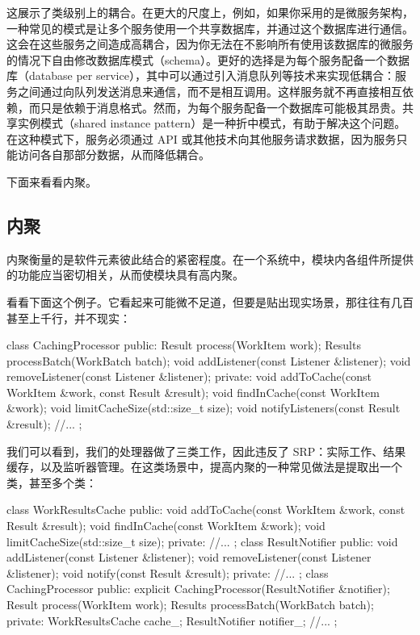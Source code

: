 这展示了类级别上的耦合。在更大的尺度上，例如，如果你采用的是微服务架构，一种常见的模式是让多个服务使用一个共享数据库，并通过这个数据库进行通信。这会在这些服务之间造成高耦合，因为你无法在不影响所有使用该数据库的微服务的情况下自由修改数据库模式（schema）。更好的选择是为每个服务配备一个数据库（database per service），其中可以通过引入消息队列等技术来实现低耦合：服务之间通过向队列发送消息来通信，而不是相互调用。这样服务就不再直接相互依赖，而只是依赖于消息格式。然而，为每个服务配备一个数据库可能极其昂贵。共享实例模式（shared instance pattern）是一种折中模式，有助于解决这个问题。在这种模式下，服务必须通过 API 或其他技术向其他服务请求数据，因为服务只能访问各自那部分数据，从而降低耦合。


\label{idx:070}
下面来看看内聚。

\subsection{内聚}

\label{idx:071}
内聚衡量的是软件元素彼此结合的紧密程度。在一个系统中，模块内各组件所提供的功能应当密切相关，从而使模块具有高内聚。

看看下面这个例子。它看起来可能微不足道，但要是贴出现实场景，那往往有几百甚至上千行，并不现实：

\begin{codebox}[cpp]
class CachingProcessor {
public:
    Result process(WorkItem work);
    Results processBatch(WorkBatch batch);
    void addListener(const Listener &listener);
    void removeListener(const Listener &listener);
private:
    void addToCache(const WorkItem &work, const Result &result);
    void findInCache(const WorkItem &work);
    void limitCacheSize(std::size_t size);
    void notifyListeners(const Result &result);
    //...
};
\end{codebox}

我们可以看到，我们的处理器做了三类工作，因此违反了 SRP：实际工作、结果缓存，以及监听器管理。在这类场景中，提高内聚的一种常见做法是提取出一个类，甚至多个类：

\begin{codebox}[cpp]
class WorkResultsCache {
public:
    void addToCache(const WorkItem &work, const Result &result);
    void findInCache(const WorkItem &work);
    void limitCacheSize(std::size_t size);
private:
    //...
};
class ResultNotifier {
public:
    void addListener(const Listener &listener);
    void removeListener(const Listener &listener);
    void notify(const Result &result);
private:
    //...
};
class CachingProcessor {
public:
    explicit CachingProcessor(ResultNotifier &notifier);
    Result process(WorkItem work);
    Results processBatch(WorkBatch batch);
private:
    WorkResultsCache cache_;
    ResultNotifier notifier_;
    //...
};
\end{codebox}

